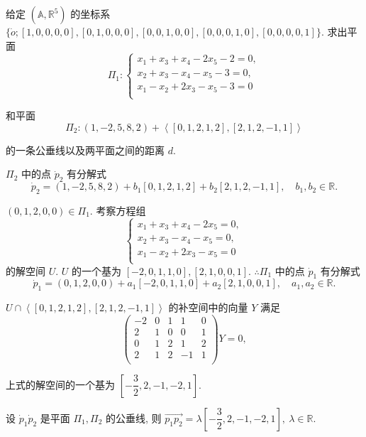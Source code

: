 \documentclass{ctexart}
\begin{document}
\begin{exercise}[2.2]
    给定 $(\mathbb{A},\mathbb{R}^5)$ 的坐标系 $\{\dot{o};[1,0,0,0,0],[0,1,0,0,0],[0,0,1,0,0],[0,0,0,1,0],[0,0,0,0,1]\}$. 求出平面
    \[\varPi_1:\begin{cases}
        x_1+x_3+x_4-2x_5-2=0, \\
        x_2+x_3-x_4-x_5-3=0, \\
        x_1-x_2+2x_3-x_5-3=0 \\
    \end{cases}\]

    和平面
    \[\varPi_2:(1,-2,5,8,2)+\left<[0,1,2,1,2],[2,1,2,-1,1]\right>\]

    的一条公垂线以及两平面之间的距离 $d$.
\end{exercise}
\begin{solution}
    $\varPi_2$ 中的点 $\dot{p}_2$ 有分解式
    \[\dot{p}_2=(1,-2,5,8,2)+b_1[0,1,2,1,2]+b_2[2,1,2,-1,1],\quad b_1,b_2\in\mathbb{R}.\]

    $(0,1,2,0,0)\in\varPi_1$. 考察方程组
    \[\begin{cases}
        x_1+x_3+x_4-2x_5=0, \\
        x_2+x_3-x_4-x_5=0, \\
        x_1-x_2+2x_3-x_5=0 \\
    \end{cases}\]
    的解空间 $U$. $U$ 的一个基为 $[-2,0,1,1,0],[2,1,0,0,1]$. $\therefore\varPi_1$ 中的点 $\dot{p}_1$ 有分解式
    \[\dot{p}_1=(0,1,2,0,0)+a_1[-2,0,1,1,0]+a_2[2,1,0,0,1],\quad a_1,a_2\in\mathbb{R}.\]

    $U\cap\left<[0,1,2,1,2],[2,1,2,-1,1]\right>$ 的补空间中的向量 $Y$ 满足
    \[\begin{pmatrix}
        -2 & 0 & 1 & 1 & 0 \\
        2 & 1 & 0 & 0 & 1 \\
        0 & 1 & 2 & 1 & 2 \\
        2 & 1 & 2 & -1 & 1 \\
    \end{pmatrix}Y=0,\]

    上式的解空间的一个基为 $\left[-\dfrac{3}{2},2,-1,-2,1\right]$.

    设 $\dot{p}_1\dot{p}_2$ 是平面 $\varPi_1,\varPi_2$ 的公垂线, 则 $\overrightarrow{p_1p_2}=\lambda\left[-\dfrac{3}{2},2,-1,-2,1\right],\ \lambda\in\mathbb{R}$.


\end{solution}
\end{document}
